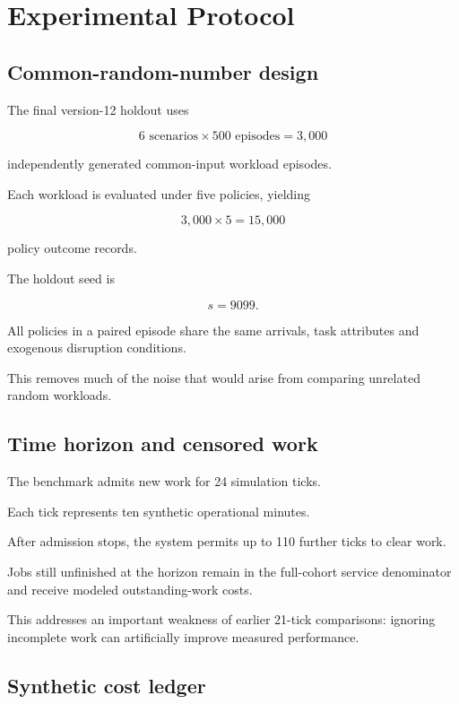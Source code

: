 \documentclass[10pt,a4paper]{article}
\theoremstyle{plain}
\theoremstyle{definition}
\theoremstyle{remark}
\begin{document}
\section{Experimental Protocol}

\subsection{Common-random-number design}

The final version-12 holdout uses

\[
6\text{ scenarios}
\times
500\text{ episodes}
=
3{,}000
\]

independently generated
common-input workload episodes.

Each workload is evaluated under
five policies, yielding

\[
3{,}000\times5
=
\boxed{15{,}000}
\]

policy outcome records.

The holdout seed is

\[
s=9099.
\]

All policies in a paired episode share
the same arrivals, task attributes
and exogenous disruption conditions.

This removes much of the noise
that would arise from comparing
unrelated random workloads.

\subsection{Time horizon and censored work}

The benchmark admits new work for
24 simulation ticks.

Each tick represents ten
synthetic operational minutes.

After admission stops,
the system permits up to 110 further
ticks to clear work.

Jobs still unfinished at the horizon
remain in the full-cohort
service denominator
and receive modeled outstanding-work costs.

This addresses an important weakness
of earlier 21-tick comparisons:
ignoring incomplete work can
artificially improve measured performance.

\subsection{Synthetic cost ledger}
\end{document}
